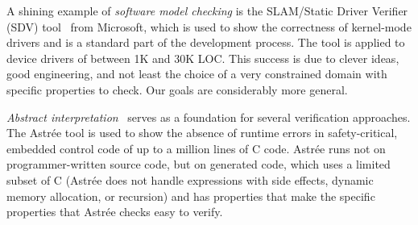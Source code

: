 \documentclass{sig-alternate}
\begin{document}
A shining example of \emph{software model checking}
is the SLAM/Static Driver Verifier (SDV)
tool~\cite{BallMMR2001,BallBKL2010,BallLR2011} from Microsoft, which
is used to show the correctness of kernel-mode drivers and is a standard
part of the development process.
The tool is applied to device drivers of between 1K and 30K LOC\@.
This success is due to clever ideas, good engineering, and not least the
choice of a very constrained domain with specific properties to check.  Our
goals are considerably more general.

\newcommand\astree{Astr\'{e}e}

\emph{Abstract interpretation}~\cite{CousotCousot1977,Cousot2007}
serves as a foundation for several verification approaches.
The \astree{} tool is used to show the absence of runtime errors in
safety-critical, embedded control code of up to a million lines of C
code.
\astree{} runs not on
programmer-written source code, but on generated code, which uses a limited
subset of C (\astree{} does not handle expressions with side effects,
dynamic memory allocation, or recursion) and has properties
that make the specific properties that \astree{} checks easy to verify.
\end{document}
